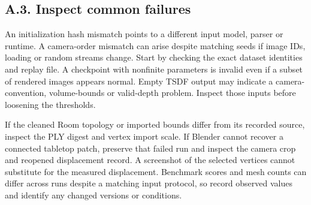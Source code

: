 \subsection*{A.3. Inspect common failures}
An initialization hash mismatch points to a different input model, parser or runtime. A camera-order mismatch can arise despite matching seeds if image IDs, loading or random streams change. Start by checking the exact dataset identities and replay file. A checkpoint with nonfinite parameters is invalid even if a subset of rendered images appears normal. Empty TSDF output may indicate a camera-convention, volume-bounds or valid-depth problem. Inspect those inputs before loosening the thresholds.

If the cleaned Room topology or imported bounds differ from its recorded source, inspect the PLY digest and vertex import scale. If Blender cannot recover a connected tabletop patch, preserve that failed run and inspect the camera crop and reopened displacement record. A screenshot of the selected vertices cannot substitute for the measured displacement. Benchmark scores and mesh counts can differ across runs despite a matching input protocol, so record observed values and identify any changed versions or conditions.
